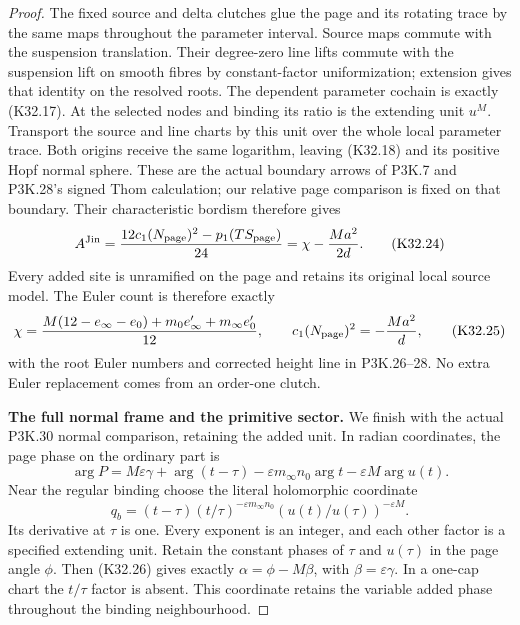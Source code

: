 \begin{proof}
The fixed source and delta clutches glue the page
and its rotating trace by the same maps throughout
the parameter interval. Source maps commute with
the suspension translation. Their degree-zero
line lifts commute with the suspension lift on
smooth fibres by constant-factor uniformization;
extension gives that identity on the resolved
roots. The dependent parameter cochain is exactly
(K32.17). At the selected nodes and binding its
ratio is the extending unit $u^M$. Transport the
source and line charts by this unit over the
whole local parameter trace. Both origins receive
the same logarithm, leaving (K32.18) and its
positive Hopf normal sphere. These are the actual
boundary arrows of P3K.7 and P3K.28's signed Thom
calculation; our relative page comparison is
fixed on that boundary. Their characteristic
bordism therefore gives
\[
 A^{\rm Jin}
 =\frac{12c_1(N_{\rm page})^2-p_1(TS_{\rm page})}{24}
 =\chi-\frac{Ma^2}{2d}.                               \tag{K32.24}
\]
Every added site is unramified on the page and
retains its original local source model. The
Euler count is therefore exactly
\[
 \chi=\frac{M(12-e_\infty-e_0)
                +m_0e_\infty'+m_\infty e_0'}{12},
 \qquad c_1(N_{\rm page})^2=-\frac{Ma^2}{d},             \tag{K32.25}
\]
with the root Euler numbers and corrected height
line in P3K.26--28. No extra Euler replacement
comes from an order-one clutch.

\par\medskip\noindent\textbf{The full normal frame and the primitive sector.}
We finish with the actual P3K.30 normal comparison,
retaining the added unit. In radian coordinates,
the page phase on the ordinary part is
\[
 \arg P=M\varepsilon\gamma+\arg(t-\tau)
       -\varepsilon m_\infty n_0\arg t
       -\varepsilon M\arg u(t).
\]
Near the regular binding choose the literal
holomorphic coordinate
\[
 q_b=(t-\tau)(t/\tau)^{-\varepsilon m_\infty n_0}
                  (u(t)/u(\tau))^{-\varepsilon M}.      \tag{K32.26}
\]
Its derivative at $\tau$ is one. Every exponent
is an integer, and each other factor is a
specified extending unit. Retain the constant
phases of $\tau$ and $u(\tau)$ in the page
angle $\phi$. Then (K32.26) gives exactly
$\alpha=\phi-M\beta$, with
$\beta=\varepsilon\gamma$. In a one-cap chart
the $t/\tau$ factor is absent. This coordinate
retains the variable added phase throughout
the binding neighbourhood.


\end{proof}
